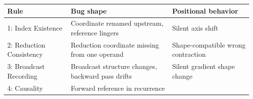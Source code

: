 \documentclass[11pt,titlepage]{article}
\begin{document}
\begin{longtable}[]{@{}lll@{}}
\toprule
\begin{minipage}[b]{0.30\columnwidth}\raggedright
Rule\strut
\end{minipage} & \begin{minipage}[b]{0.30\columnwidth}\raggedright
Bug shape\strut
\end{minipage} & \begin{minipage}[b]{0.30\columnwidth}\raggedright
Positional behavior\strut
\end{minipage}\tabularnewline
\midrule
\endhead
\begin{minipage}[t]{0.30\columnwidth}\raggedright
1: Index Existence\strut
\end{minipage} & \begin{minipage}[t]{0.30\columnwidth}\raggedright
Coordinate renamed upstream, reference lingers\strut
\end{minipage} & \begin{minipage}[t]{0.30\columnwidth}\raggedright
Silent axis shift\strut
\end{minipage}\tabularnewline
\begin{minipage}[t]{0.30\columnwidth}\raggedright
2: Reduction Consistency\strut
\end{minipage} & \begin{minipage}[t]{0.30\columnwidth}\raggedright
Reduction coordinate missing from one operand\strut
\end{minipage} & \begin{minipage}[t]{0.30\columnwidth}\raggedright
Shape-compatible wrong contraction\strut
\end{minipage}\tabularnewline
\begin{minipage}[t]{0.30\columnwidth}\raggedright
3: Broadcast Recording\strut
\end{minipage} & \begin{minipage}[t]{0.30\columnwidth}\raggedright
Broadcast structure changes, backward pass drifts\strut
\end{minipage} & \begin{minipage}[t]{0.30\columnwidth}\raggedright
Silent gradient shape change\strut
\end{minipage}\tabularnewline
\begin{minipage}[t]{0.30\columnwidth}\raggedright
4: Causality\strut
\end{minipage} & \begin{minipage}[t]{0.30\columnwidth}\raggedright
Forward reference in recurrence\strut

\end{minipage}
\end{longtable}
\end{document}
